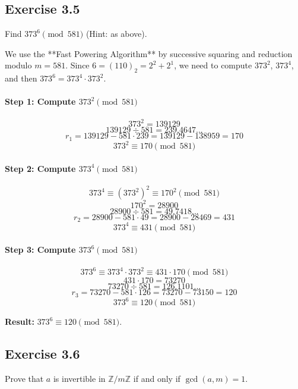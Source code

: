 \subsection*{Exercise 3.5}
Find $373^6 \pmod{581}$ (Hint: as above).

\begin{solution}
We use the **Fast Powering Algorithm** by successive squaring and reduction modulo $m=581$.
Since $6 = (110)_2 = 2^2 + 2^1$, we need to compute $373^2$, $373^4$, and then $373^6 = 373^4 \cdot 373^2$.

\paragraph{Step 1: Compute $373^2 \pmod{581}$}
$$ 373^2 = 139129 $$
$$ 139129 \div 581 = 239.4647... $$
$$ r_1 = 139129 - 581 \cdot 239 = 139129 - 138959 = 170 $$
$$ 373^2 \equiv 170 \pmod{581} $$

\paragraph{Step 2: Compute $373^4 \pmod{581}$}
$$ 373^4 \equiv (373^2)^2 \equiv 170^2 \pmod{581} $$
$$ 170^2 = 28900 $$
$$ 28900 \div 581 = 49.7418... $$
$$ r_2 = 28900 - 581 \cdot 49 = 28900 - 28469 = 431 $$
$$ 373^4 \equiv 431 \pmod{581} $$

\paragraph{Step 3: Compute $373^6 \pmod{581}$}
$$ 373^6 \equiv 373^4 \cdot 373^2 \equiv 431 \cdot 170 \pmod{581} $$
$$ 431 \cdot 170 = 73270 $$
$$ 73270 \div 581 = 126.1101... $$
$$ r_3 = 73270 - 581 \cdot 126 = 73270 - 73150 = 120 $$
$$ 373^6 \equiv 120 \pmod{581} $$

\textbf{Result:} $373^6 \equiv 120 \pmod{581}$.
\end{solution}

\subsection*{Exercise 3.6}
Prove that $a$ is invertible in $\mathbb{Z}/m\mathbb{Z}$ if and only if $\gcd(a,m)=1$.

